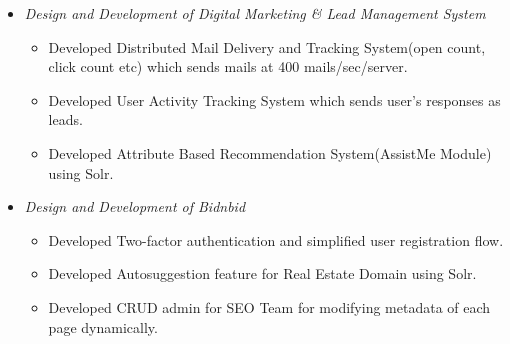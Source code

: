 \documentclass[margin,line]{resume}
\begin{document}
\begin{resume}
\begin{itemize}
     \item \textsl{Design and Development of Digital Marketing \& Lead Management System}
        \begin{itemize}
            \item Developed Distributed Mail Delivery and Tracking System(open count, click count etc) which
sends mails at 400 mails/sec/server.
            \item Developed User Activity Tracking System  which sends user's responses as leads.
			\item Developed Attribute Based Recommendation System(AssistMe Module) using Solr.
        \end{itemize}



    \item \textsl{Design and Development of Bidnbid}
        \begin{itemize}
            \item Developed​ Two-factor authentication​ and simplified user registration flow.
            \item Developed ​Autosuggestion ​feature for Real Estate Domain using Solr.
            \item Developed CRUD admin for SEO Team for modifying metadata of each page dynamically.
        \end{itemize}



%
%
    \end{itemize}


\end{resume}
\end{document}
